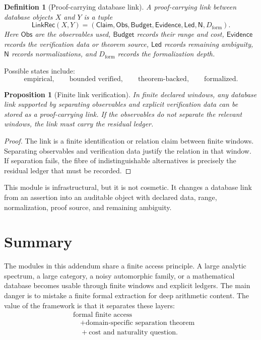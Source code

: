 \documentclass[11pt]{article}
\newtheorem{proposition}[theorem]{Proposition}
\newtheorem{definition}[theorem]{Definition}
\begin{document}
\begin{definition}[Proof-carrying database link]
A proof-carrying link between database objects \(X\) and \(Y\) is a tuple
\[
\mathsf{LinkRec}(X,Y)=
(\mathsf{Claim},\mathsf{Obs},\mathsf{Budget},\mathsf{Evidence},
\mathsf{Led},\mathsf N,D_{\mathrm{form}}).
\]
Here \(\mathsf{Obs}\) are the observables used, \(\mathsf{Budget}\) records their range and cost, \(\mathsf{Evidence}\) records the verification data or theorem source, \(\mathsf{Led}\) records remaining ambiguity, \(\mathsf N\) records normalizations, and \(D_{\mathrm{form}}\) records the formalization depth.
\end{definition}

Possible states include:
\[
\text{empirical},
\qquad
\text{bounded verified},
\qquad
\text{theorem-backed},
\qquad
\text{formalized}.
\]

\begin{proposition}[Finite link verification]
In finite declared windows, any database link supported by separating observables and explicit verification data can be stored as a proof-carrying link.  If the observables do not separate the relevant windows, the link must carry the residual ledger.
\end{proposition}

\begin{proof}
The link is a finite identification or relation claim between finite windows.  Separating observables and verification data justify the relation in that window.  If separation fails, the fibre of indistinguishable alternatives is precisely the residual ledger that must be recorded.
\end{proof}

This module is infrastructural, but it is not cosmetic.  It changes a database link from an assertion into an auditable object with declared data, range, normalization, proof source, and remaining ambiguity.

\section{Summary}

The modules in this addendum share a finite access principle.  A large analytic spectrum, a large category, a noisy automorphic family, or a mathematical database becomes usable through finite windows and explicit ledgers.  The main danger is to mistake a finite formal extraction for deep arithmetic content.  The value of the framework is that it separates these layers:
\[
\begin{aligned}
&\text{formal finite access}\\
&\quad+\text{domain-specific separation theorem}\\
&\quad+\text{cost and naturality question}.
\end{aligned}
\]
\end{document}
